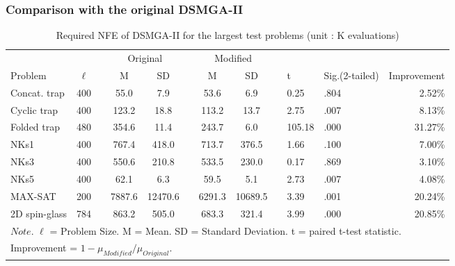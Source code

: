 \subsubsection{ Comparison with the original DSMGA-II }

\begin{table}[ht]
\centering
\label{my-label}
\begin{tabular}{lclcclcclllr}
\hline
              &        &  & \multicolumn{2}{c}{Original} &  & \multicolumn{2}{c}{Modified} &  &       		&					&         		\\ \cline{4-5} \cline{7-8}
Problem       & $\ell$ &  & M            & SD            &  & M            & SD            &  & t			& Sig.(2-tailed)	& Improvement  \\ \hline
Concat. trap  & 400    &  & 55.0         & 7.9           &  & 53.6         & 6.9           &  & 0.25   		& .804				& 2.52\%  \\
Cyclic trap   & 400    &  & 123.2        & 18.8          &  & 113.2        & 13.7          &  & 2.75	  	& .007				& 8.13\%  \\
Folded trap   & 480    &  & 354.6        & 11.4          &  & 243.7        & 6.0           &  & 105.18 		& .000				& 31.27\% \\
NKs1          & 400    &  & 767.4        & 418.0         &  & 713.7        & 376.5         &  & 1.66     	& .100				& 7.00\%  \\
NKs3          & 400    &  & 550.6        & 210.8         &  & 533.5        & 230.0         &  & 0.17  	   	& .869				& 3.10\%  \\
NKs5          & 400    &  & 62.1         & 6.3           &  & 59.5         & 5.1           &  & 2.73  		& .007				& 4.08\%  \\
MAX-SAT       & 200    &  & 7887.6       & 12470.6       &  & 6291.3       & 10689.5       &  & 3.39    	& .001				& 20.24\% \\
2D spin-glass & 784    &  & 863.2        & 505.0         &  & 683.3        & 321.4         &  & 3.99		& .000				& 20.85\% \\ 
\hline 
\multicolumn{12}{l}{$Note.$ $\ell$ = Problem Size. M = Mean. SD = Standard Deviation. t = paired t-test statistic.} \\
\multicolumn{12}{l}{Improvement = $1 - \mu_{Modified}/\mu_{Original}$. }
\end{tabular}
\caption{Required NFE of DSMGA-II for the largest test problems (unit : K evaluations)}
\end{table}



